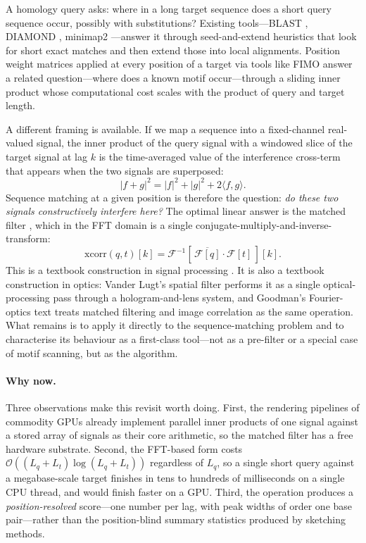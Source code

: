 \documentclass[twocolumn,11pt,a4paper]{article}
\theoremstyle{definition}
\theoremstyle{remark}
\newcommand{\bigO}{\mathcal{O}}
\newcommand{\F}{\mathcal{F}}
\begin{document}
A homology query asks: where in a long target sequence does a short query
sequence occur, possibly with substitutions? Existing tools---BLAST
\citep{altschul1990, altschul1997}, DIAMOND \citep{buchfink2015},
minimap2 \citep{li2018}---answer it through seed-and-extend heuristics
that look for short exact matches and then extend those into local
alignments. Position weight matrices \citep{stormo2000, schneider1986}
applied at every position of a target via tools like FIMO
\citep{grant2011} answer a related question---where does a known motif
occur---through a sliding inner product whose computational cost scales
with the product of query and target length.

A different framing is available. If we map a sequence into a
fixed-channel real-valued signal, the inner product of the query
signal with a windowed slice of the target signal at lag $k$ is the
time-averaged value of the interference cross-term that appears when the
two signals are superposed:
\begin{equation}
    | f + g |^2 = | f |^2 + | g |^2 + 2 \langle f, g \rangle.
    \label{eq:interference}
\end{equation}
Sequence matching at a given position is therefore the question:
\emph{do these two signals constructively interfere here?} The optimal
linear answer is the matched filter \citep{turin1960, north1963}, which
in the FFT domain is a single conjugate-multiply-and-inverse-transform:
\begin{equation}
    \mathrm{xcorr}(q, t)[k] = \F^{-1}\!\left[\, \overline{\F[q]} \cdot \F[t] \,\right]\![k].
    \label{eq:fft_xcorr}
\end{equation}
This is a textbook construction in signal processing
\citep{vantrees2001, kay1998, oppenheim2009}. It is also a textbook
construction in optics: Vander Lugt's spatial filter
\citep{vanderlugt1964} performs it as a single optical-processing pass
through a hologram-and-lens system, and Goodman's Fourier-optics text
\citep{goodman2005} treats matched filtering and image correlation as
the same operation. What remains is to apply it directly to the
sequence-matching problem and to characterise its behaviour as a
first-class tool---not as a pre-filter or a special case of motif
scanning, but as the algorithm.

\paragraph{Why now.} Three observations make this revisit worth doing.
First, the rendering pipelines of commodity GPUs already implement
parallel inner products of one signal against a stored array of
signals as their core arithmetic, so the matched filter has a free
hardware substrate. Second, the FFT-based form costs
$\bigO((L_q + L_t) \log(L_q + L_t))$ regardless of $L_q$, so a single
short query against a megabase-scale target finishes in tens to
hundreds of milliseconds on a single CPU thread, and would
finish faster on a GPU. Third, the operation produces a
\emph{position-resolved} score---one number per lag, with peak widths
of order one base pair---rather than the position-blind summary
statistics produced by sketching methods.
\end{document}

